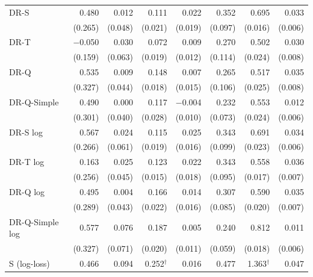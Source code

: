 \documentclass{article}
\begin{document}
\begin{table}[H]
\begin{tabular}{l|rrrrrrr}
\hline
DR-S & 0.480 & 0.012 & 0.111 & 0.022 & 0.352 & 0.695 & 0.033 \\
 & \scriptsize (0.265) & \scriptsize (0.048) & \scriptsize (0.021) & \scriptsize (0.019) & \scriptsize (0.097) & \scriptsize (0.016) & \scriptsize (0.006) \\[2pt]
DR-T & $-$0.050 & 0.030 & 0.072 & 0.009 & 0.270 & 0.502 & 0.030 \\
 & \scriptsize (0.159) & \scriptsize (0.063) & \scriptsize (0.019) & \scriptsize (0.012) & \scriptsize (0.114) & \scriptsize (0.024) & \scriptsize (0.008) \\[2pt]
DR-Q & 0.535 & 0.009 & 0.148 & 0.007 & 0.265 & 0.517 & 0.035 \\
 & \scriptsize (0.327) & \scriptsize (0.044) & \scriptsize (0.018) & \scriptsize (0.015) & \scriptsize (0.106) & \scriptsize (0.025) & \scriptsize (0.008) \\[2pt]
DR-Q-Simple & 0.490 & 0.000 & 0.117 & $-$0.004 & 0.232 & 0.553 & 0.012 \\
 & \scriptsize (0.301) & \scriptsize (0.040) & \scriptsize (0.028) & \scriptsize (0.010) & \scriptsize (0.073) & \scriptsize (0.024) & \scriptsize (0.006) \\[2pt]
\hline
DR-S log & 0.567 & 0.024 & 0.115 & 0.025 & 0.343 & 0.691 & 0.034 \\
 & \scriptsize (0.266) & \scriptsize (0.061) & \scriptsize (0.019) & \scriptsize (0.016) & \scriptsize (0.099) & \scriptsize (0.023) & \scriptsize (0.006) \\[2pt]
DR-T log & 0.163 & 0.025 & 0.123 & 0.022 & 0.343 & 0.558 & 0.036 \\
 & \scriptsize (0.256) & \scriptsize (0.045) & \scriptsize (0.015) & \scriptsize (0.018) & \scriptsize (0.095) & \scriptsize (0.017) & \scriptsize (0.007) \\[2pt]
DR-Q log & 0.495 & 0.004 & 0.166 & 0.014 & 0.307 & 0.590 & 0.035 \\
 & \scriptsize (0.289) & \scriptsize (0.043) & \scriptsize (0.022) & \scriptsize (0.016) & \scriptsize (0.085) & \scriptsize (0.020) & \scriptsize (0.007) \\[2pt]
DR-Q-Simple log & 0.577 & 0.076 & 0.187 & 0.005 & 0.240 & 0.812 & 0.011 \\
 & \scriptsize (0.327) & \scriptsize (0.071) & \scriptsize (0.020) & \scriptsize (0.011) & \scriptsize (0.059) & \scriptsize (0.018) & \scriptsize (0.006) \\[2pt]
\hline
S (log-loss) & 0.466 & 0.094 & 0.252$^\dagger$ & 0.016 & 0.477 & 1.363$^\dagger$ & 0.047 \\

\end{tabular}
\end{table}
\end{document}
